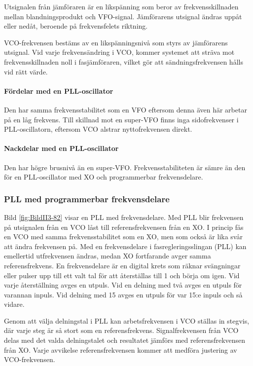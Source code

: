 Utsignalen från jämföraren är en likspänning som beror av frekvensskillnaden
mellan blandningsprodukt och VFO-signal.
Jämförarens utsignal ändras uppåt eller nedåt, beroende på frekvensfelets
riktning.

VCO-frekvensen bestäms av en likspänningsnivå som styrs av jämförarens
utsignal.
Vid varje frekvensändring i VCO, kommer systemet att sträva mot
frekvensskillnaden noll i fasjämföraren, vilket gör att sändningsfrekvensen
hålls vid rätt värde.

\paragraph{Fördelar med en PLL-oscillator}
Den har samma frekvensstabilitet som en VFO eftersom denna även här arbetar på
en låg frekvens.
Till skillnad mot en super-VFO finns inga sidofrekvenser i PLL-oscillatorn,
eftersom VCO alstrar nyttofrekvensen direkt.

\paragraph{Nackdelar med en PLL-oscillator}
Den har högre brusnivå än en super-VFO.
Frekvensstabiliteten är sämre än den för en PLL-oscillator med XO och
programmerbar frekvensdelare.

\subsubsection{PLL med programmerbar frekvensdelare}


Bild \ref{fig:BildII3-82} visar en PLL med frekvensdelare.
Med PLL blir frekvensen på utsignalen från en VCO låst till referensfrekvensen 
från en XO.
I princip fås en VCO med samma frekvensstabilitet som en XO, men som också är 
lika svår att ändra frekvensen på.
Med en frekvensdelare i fasregleringsslingan (PLL) kan emellertid utfrekvensen
ändras, medan XO fortfarande avger samma referensfrekvens.
En frekvensdelare är en digital krets som räknar svängningar eller pulser upp
till ett valt tal för att återställas till 1 och börja om igen.
Vid varje återställning avges en utpuls.
Vid en delning med två avges en utpuls för varannan inpuls.
Vid delning med 15 avges en utpuls för var 15:e inpuls och så vidare.

Genom att välja delningstal i PLL kan arbetsfrekvensen i VCO ställas
in stegvis, där varje steg är så stort som en referensfrekvens.
Signalfrekvensen från VCO delas med det valda delningstalet och resultatet
jämförs med referensfrekvensen från XO.
Varje avvikelse referensfrekvensen kommer att medföra justering av 
VCO-frekvensen.

